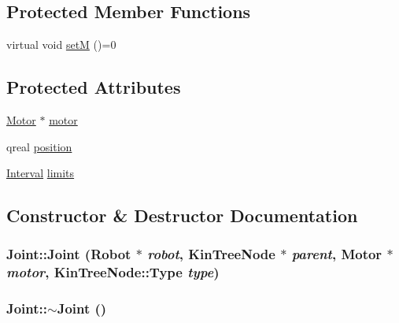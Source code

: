 \subsection*{Protected Member Functions}
\begin{DoxyCompactItemize}
\item 
virtual void \hyperlink{class_robot_model_1_1_joint_a485f5fc46f5156a7383bee7edbfc6643}{setM} ()=0
\end{DoxyCompactItemize}
\subsection*{Protected Attributes}
\begin{DoxyCompactItemize}
\item 
\hyperlink{class_robot_model_1_1_motor}{Motor} $\ast$ \hyperlink{class_robot_model_1_1_joint_a9fe40b0c9b6562d7a4cce3dd8715f945}{motor}
\item 
qreal \hyperlink{class_robot_model_1_1_joint_aada2db465b0f51975a3c928656a9924c}{position}
\item 
\hyperlink{class_robot_model_1_1_interval}{Interval} \hyperlink{class_robot_model_1_1_joint_a3991756cd74729b87bde02b679c95b4c}{limits}
\end{DoxyCompactItemize}


\subsection{Constructor \& Destructor Documentation}
\hypertarget{class_robot_model_1_1_joint_ac0077acd1f45742c84c3468cce889600}{
\subsubsection[{Joint}]{\setlength{\rightskip}{0pt plus 5cm}Joint::Joint ({\bf Robot} $\ast$ {\em robot}, \/  {\bf KinTreeNode} $\ast$ {\em parent}, \/  {\bf Motor} $\ast$ {\em motor}, \/  {\bf KinTreeNode::Type} {\em type})}}
\label{class_robot_model_1_1_joint_ac0077acd1f45742c84c3468cce889600}
\hypertarget{class_robot_model_1_1_joint_a42aca0bd1832136984923713127c28f1}{
\subsubsection[{$\sim$Joint}]{\setlength{\rightskip}{0pt plus 5cm}Joint::$\sim$Joint ()}}
\label{class_robot_model_1_1_joint_a42aca0bd1832136984923713127c28f1}


